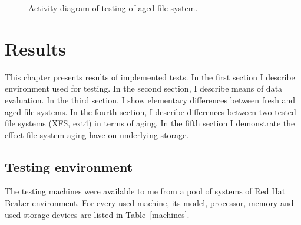 \documentclass[
  color, %
  table, %
  lof,   %
  lot,   %
]{fithesis3}
\begin{document}
\begin{figure}[ht]
    \centering
    \caption{Activity diagram of testing of aged file system.}
    \label{fig:rec_activity}
\end{figure}







\chapter{Results}
\label{results}
This chapter presents results of implemented tests. In the first section I describe environment used for testing. In the second section, I describe means of data evaluation. In the third section, I show elementary differences between fresh and aged file systems. In the fourth section, I describe differences between two tested file systems (XFS, ext4) in terms of aging. In the fifth section I demonstrate the effect file system aging have on underlying storage.

\section{Testing environment}
\label{env}
The testing machines were available to me from a pool of systems of Red Hat Beaker environment. For every used machine, its model, processor, memory and used storage devices are listed in Table~\ref{machines}.
\end{document}
